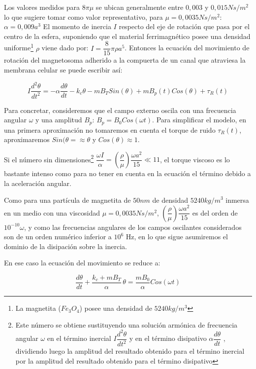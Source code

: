 Los valores medidos para $8\pi\mu$ se ubican generalmente entre $0,003$ y $0,015 Ns/m^{2}$ lo que sugiere tomar como valor representativo, para $\mu=0,0035 Ns/m^{2}$: $\alpha=0,009 a^{3}$
El momento de inercia $I$ respecto del eje de rotación que pasa por el centro de la esfera, suponiendo que el material ferrimagnético posee una densidad uniforme\footnote{La magnetita ($Fe_{3}O_{4}$) posee una densidad de $5240 kg/m^{3}$} $\rho$ viene dado por: $I=\dfrac{8}{15}\pi\rho a^{5}$. Entonces la ecuación del movimiento de rotación del magnetosoma adherido a la compuerta de un canal que atraviesa la membrana celular se puede escribir así:

\begin{equation}
	\label{eq:62}
	I\dfrac{d^{2}\theta}{dt^{2}}=-\alpha\dfrac{d\theta}{dt}-k_{c}\theta-mB_{T}Sin(\theta)+mB_{p}(t)Cos(\theta)+\tau_{R}(t)
\end{equation}

Para concretar, consideremos que el campo externo oscila con una frecuencia angular $\omega$ y una amplitud $B_{p}$: $B_{p}=B_{0}Cos(\omega t)$. Para simplificar el modelo, en una primera aproximación no tomaremos en cuenta el torque de ruido $\tau_{R}(t)$, aproximaremos $Sin(\theta= \approx \theta$ y $Cos(\theta) \approx 1$.

Si el número sin dimensiones\footnote{Este número se obtiene sustituyendo una solución armónica de frecuencia angular $\omega$ en el término inercial $I\dfrac{d^{2}\theta}{dt^{2}}$ y en el término disipativo $\alpha\dfrac{d\theta}{dt}$ , dividiendo luego la amplitud del resultado obtenido para el término inercial por la amplitud del resultado obtenido para el término disipativo} $\dfrac{\omega I}{\alpha}=\left( \dfrac{\rho}{\mu}\right)\dfrac{\omega a^{2}}{15}\ll1 1 $, el torque viscoso es lo bastante intenso como para no tener en cuenta en la ecuación el término debido a la aceleración angular.

Como para una partícula de magnetita de $50 nm$ de densidad $5240 kg/m^{3}$ inmersa en un medio con una viscosidad $\mu=0,0035 Ns/m^{2}$, $\left( \dfrac{\rho}{\mu}\right)\dfrac{\omega a^{2}}{15}$ es del orden de $10^{−10}\omega$, y como las frecuencias angulares de los campos oscilantes considerados son de un orden numérico inferior a $10^{6}$ Hz, en lo que sigue asumiremos el dominio de la disipación sobre la inercia.

En ese caso la ecuación del movimiento se reduce a:

\begin{equation}
	\label{eq:63}
	\dfrac{d\theta}{dt}+\dfrac{k_{c}+mB_{T}}{\alpha}\,\theta=\dfrac{mB_{0}}{\alpha}Cos(\omega t)
\end{equation}


